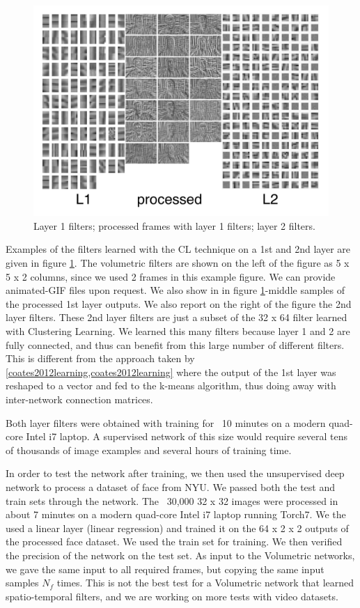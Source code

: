 \documentclass{article} %
\begin{document}
\begin{figure}
\centering
\includegraphics[width=5in]{fig-filtersproc.png}
\caption{Layer 1 filters; processed frames with layer 1 filters; layer 2 filters.}
\label{fig-filterproc}
\end{figure}


Examples of the filters learned with the CL technique on a 1st and 2nd layer are given in figure \ref{fig-filterproc}. The volumetric filters are shown on the left of the figure as 5 x 5 x 2 columns, since we used 2 frames in this example figure. We can provide animated-GIF files upon request. We also show in in figure \ref{fig-filterproc}-middle samples of the processed  1st layer outputs. We also report on the right of the figure the 2nd layer filters. These 2nd layer filters are just a subset of the 32 x 64 filter learned with Clustering Learning. We learned this many filters because layer 1 and 2 are fully connected, and thus can benefit from this large number of different filters. This is different from the approach taken by \ref{coates2012learning,coates2012learning} where the output of the 1st layer was reshaped to a vector and fed to the k-means algorithm, thus doing away with inter-network connection matrices. 

Both layer filters were obtained with training for ~10 minutes on a modern quad-core Intel i7 laptop. A supervised network of this size would require several tens of thousands of image examples and several hours of training time.

In order to test the network after training, we then used the unsupervised deep network to process a dataset of face from NYU. We passed both the test and train sets through the network. The ~30,000 32 x 32 images were processed in about 7 minutes on a modern quad-core Intel i7 laptop running Torch7. We the used a linear layer (linear regression) and trained it on the 64 x 2 x 2 outputs of the processed face dataset. We used the train set for training. We then verified the precision of the network on the test set.
As input to the Volumetric networks, we gave the same input to all required frames, but copying the same input samples $N_f$ times. This is not the best test for a Volumetric network that learned spatio-temporal filters, and we are working on more tests with video datasets.
\end{document}
